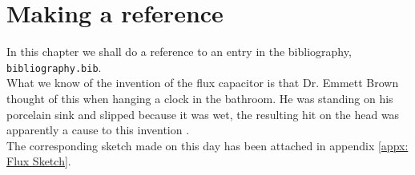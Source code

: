 \section{Making a reference}
\label{sec: Reference}

\noindent In this chapter we shall do a reference to an entry in the bibliography, \texttt{bibliography.bib}. \\

What we know of the invention of the flux capacitor is that Dr. Emmett Brown thought of this when hanging a clock in the bathroom. He was standing on his porcelain sink and slipped because it was wet, the resulting hit on the head was apparently a cause to this invention \cite{example}.\\

The corresponding sketch made on this day has been attached in appendix \ref{appx: Flux Sketch}.

